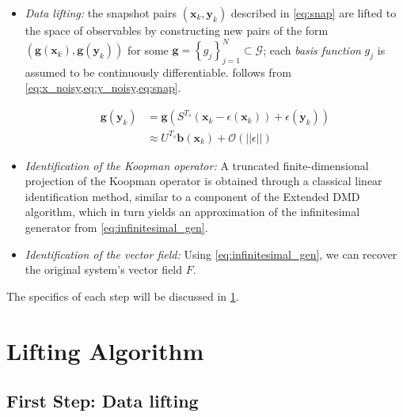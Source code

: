 \documentclass{article}
\begin{document}
        \begin{itemize}
            \item \textit{Data lifting:} the snapshot pairs $\left(\mathbf{x}_k,\mathbf{y}_k\right)$ described in \cref{eq:snap} are lifted to the space of observables by constructing new pairs of the form\\$\left(\mathbf{g}\left(\mathbf{x}_k\right),\mathbf{g}\left(\mathbf{y}_k\right)\right)$ for some $\mathbf{g} = \left\{g_j\right\}_{j=1}^{N} \subset \mathcal{G}$; each \textit{basis function} $g_j$ is assumed to be continuously differentiable.  follows from \cref{eq:x_noisy,eq:y_noisy,eq:snap}.
            
            \begin{align} \label{eq:Koopman_snap}
                \mathbf{g} \left(\mathbf{y}_k\right) &= \mathbf{g} \left(S^{T_s} \left(\mathbf{x}_k - \epsilon\left(\mathbf{x}_k\right)\right) + \epsilon\left(\mathbf{y}_k\right)\right)
                \\
                & \approx U^{T_s} \mathbf{b}\left(\mathbf{x}_k\right) + \mathcal{O} \left(\left|\left|\epsilon\right|\right|\right)
            \end{align}

            \item \textit{Identification of the Koopman operator:} A truncated finite-dimensional projection of the Koopman operator is obtained through a classical linear identification method, similar to a component of the Extended DMD algorithm\cite{EDMD}, which in turn yields an approximation of the infinitesimal generator from \ref{eq:infinitesimal_gen}.
            
            \item \textit{Identification of the vector field:} Using \ref{eq:infinitesimal_gen}, we can recover the original system's vector field $F$.
        \end{itemize}

        The specifics of each step will be discussed in \cref{sec:algorithm}.

\section{Lifting Algorithm} \label{sec:algorithm}

    \subsection{First Step: Data lifting}
\end{document}
